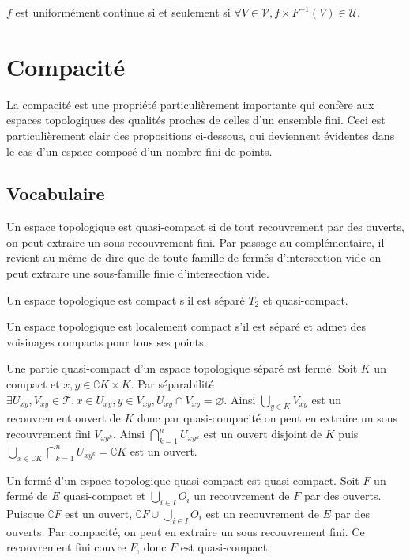 \documentclass[a4paper, 11pt, french]{book}
\theoremstyle{plain} %
\theoremstyle{definition} %
\theoremstyle{remark} %
\newcommand{\1}{\mathds{1}}
\newcommand\vide{\varnothing}
\newcommand{\inv}[1]{#1^{-1}}
\begin{document}
\proposition
$f$ est uniformément continue si et seulement si $\forall V\in\mathscr{V}, \inv{f\times F}(V)\in\mathscr{U}$.




\chapter{Compacité}

La compacité est une propriété particulièrement importante qui confère aux espaces topologiques des qualités proches de celles d’un ensemble fini.
Ceci est particulièrement clair des propositions ci-dessous, qui deviennent évidentes dans le cas d’un espace composé d’un nombre fini de points.

\section{Vocabulaire}

Un espace topologique est quasi-compact si de tout recouvrement par des ouverts, on peut extraire un sous recouvrement fini.
Par passage au complémentaire, il revient au même de dire que de toute famille de fermés d’intersection vide on peut extraire une sous-famille finie d’intersection vide.

Un espace topologique est compact s'il est séparé $T_2$ et quasi-compact.

Un espace topologique est localement compact s'il est séparé et admet des voisinages compacts pour tous ses points.

\proposition
Une partie quasi-compact d'un espace topologique séparé est fermé.
\demonstration
Soit $K$ un compact et $x, y\in\complement K\times K$.
Par séparabilité $\exists U_{xy}, V_{xy}\in\mathscr{T}, x\in U_{xy}, y\in V_{xy}, U_{xy}\cap V_{xy}=\vide$.
Ainsi $\bigcup_{y\in K}V_{xy}$ est un recouvrement ouvert de $K$ donc par quasi-compacité on peut en extraire un sous recouvrement fini $V_{xy^k}$.
Ainsi $\bigcap_{k=1}^nU_{xy^k}$ est un ouvert disjoint de $K$ puis $\bigcup_{x\in\complement K}\bigcap_{k=1}^nU_{xy^k}=\complement K$ est un ouvert.

\proposition
Un fermé d'un espace topologique quasi-compact est quasi-compact.
\demonstration
Soit $F$ un fermé de $E$ quasi-compact et $\bigcup_{i\in I}O_i$ un recouvrement de $F$ par des ouverts.
Puisque $\complement F$ est un ouvert, $\complement F\cup\bigcup_{i\in I}O_i$ est un recouvrement de $E$ par des ouverts.
Par compacité, on peut en extraire un sous recouvrement fini.
Ce recouvrement fini couvre $F$, donc $F$ est quasi-compact.
\end{document}
